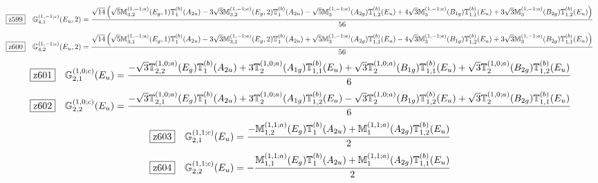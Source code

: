 \documentclass[fleqn,10pt,landscape]{jsarticle}
\begin{document}
\begin{dmath*}
\hspace*{3mm}\fbox{z599}\quad \mathbb{G}_{4,1}^{(1,-1;c)}(E_{u},2)=\frac{\sqrt{14} \left(\sqrt{5} \mathbb{M}_{3,2}^{(1,-1;a)}(E_{g},1) \mathbb{T}_{1}^{(b)}(A_{2u}) - 3 \sqrt{3} \mathbb{M}_{3,2}^{(1,-1;a)}(E_{g},2) \mathbb{T}_{1}^{(b)}(A_{2u}) - \sqrt{5} \mathbb{M}_{3}^{(1,-1;a)}(A_{2g}) \mathbb{T}_{1,2}^{(b)}(E_{u}) + 4 \sqrt{3} \mathbb{M}_{3}^{(1,-1;a)}(B_{1g}) \mathbb{T}_{1,1}^{(b)}(E_{u}) + 3 \sqrt{3} \mathbb{M}_{3}^{(1,-1;a)}(B_{2g}) \mathbb{T}_{1,2}^{(b)}(E_{u})\right)}{56}
\end{dmath*}
\begin{dmath*}
\hspace*{3mm}\fbox{z600}\quad \mathbb{G}_{4,2}^{(1,-1;c)}(E_{u},2)=\frac{\sqrt{14} \left(\sqrt{5} \mathbb{M}_{3,1}^{(1,-1;a)}(E_{g},1) \mathbb{T}_{1}^{(b)}(A_{2u}) - 3 \sqrt{3} \mathbb{M}_{3,1}^{(1,-1;a)}(E_{g},2) \mathbb{T}_{1}^{(b)}(A_{2u}) + \sqrt{5} \mathbb{M}_{3}^{(1,-1;a)}(A_{2g}) \mathbb{T}_{1,1}^{(b)}(E_{u}) - 4 \sqrt{3} \mathbb{M}_{3}^{(1,-1;a)}(B_{1g}) \mathbb{T}_{1,2}^{(b)}(E_{u}) + 3 \sqrt{3} \mathbb{M}_{3}^{(1,-1;a)}(B_{2g}) \mathbb{T}_{1,1}^{(b)}(E_{u})\right)}{56}
\end{dmath*}
\begin{dmath*}
\hspace*{3mm}\fbox{z601}\quad \mathbb{G}_{2,1}^{(1,0;c)}(E_{u})=\frac{- \sqrt{3} \mathbb{T}_{2,2}^{(1,0;a)}(E_{g}) \mathbb{T}_{1}^{(b)}(A_{2u}) + 3 \mathbb{T}_{2}^{(1,0;a)}(A_{1g}) \mathbb{T}_{1,1}^{(b)}(E_{u}) + \sqrt{3} \mathbb{T}_{2}^{(1,0;a)}(B_{1g}) \mathbb{T}_{1,1}^{(b)}(E_{u}) + \sqrt{3} \mathbb{T}_{2}^{(1,0;a)}(B_{2g}) \mathbb{T}_{1,2}^{(b)}(E_{u})}{6}
\end{dmath*}
\begin{dmath*}
\hspace*{3mm}\fbox{z602}\quad \mathbb{G}_{2,2}^{(1,0;c)}(E_{u})=\frac{- \sqrt{3} \mathbb{T}_{2,1}^{(1,0;a)}(E_{g}) \mathbb{T}_{1}^{(b)}(A_{2u}) + 3 \mathbb{T}_{2}^{(1,0;a)}(A_{1g}) \mathbb{T}_{1,2}^{(b)}(E_{u}) - \sqrt{3} \mathbb{T}_{2}^{(1,0;a)}(B_{1g}) \mathbb{T}_{1,2}^{(b)}(E_{u}) + \sqrt{3} \mathbb{T}_{2}^{(1,0;a)}(B_{2g}) \mathbb{T}_{1,1}^{(b)}(E_{u})}{6}
\end{dmath*}
\begin{dmath*}
\hspace*{3mm}\fbox{z603}\quad \mathbb{G}_{2,1}^{(1,1;c)}(E_{u})=\frac{- \mathbb{M}_{1,2}^{(1,1;a)}(E_{g}) \mathbb{T}_{1}^{(b)}(A_{2u}) + \mathbb{M}_{1}^{(1,1;a)}(A_{2g}) \mathbb{T}_{1,2}^{(b)}(E_{u})}{2}
\end{dmath*}
\begin{dmath*}
\hspace*{3mm}\fbox{z604}\quad \mathbb{G}_{2,2}^{(1,1;c)}(E_{u})=- \frac{\mathbb{M}_{1,1}^{(1,1;a)}(E_{g}) \mathbb{T}_{1}^{(b)}(A_{2u}) + \mathbb{M}_{1}^{(1,1;a)}(A_{2g}) \mathbb{T}_{1,1}^{(b)}(E_{u})}{2}
\end{dmath*}
\vspace{5mm}
\end{document}
